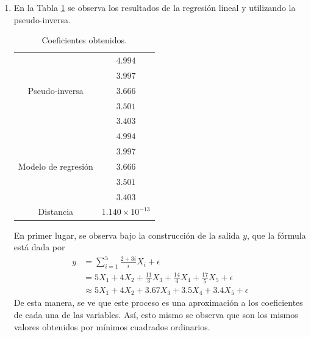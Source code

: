 \documentclass[fleqn]{article}
\begin{document}
\begin{enumerate}
  \item En la Tabla \ref{tab:coeffs} se observa los resultados de la regresión
    lineal y utilizando la pseudo-inversa.
    \begin{table}[H]
      \centering
      \begin{tabular}{cc}
        \hline
        \multirow{5}{*}{Pseudo-inversa}
        &$4.994$\\
        &$3.997$\\
        &$3.666$\\
        &$3.501$ \\
        &$3.403$ \\
        \hline
        \multirow{5}{*}{Modelo de regresión}
        &$4.994$\\
        &$3.997$ \\
        &$3.666$ \\
        &$3.501$ \\
        &$3.403$ \\
        \hline
        \multirow{1}{*}{Distancia} &$1.140 \times 10^{-13}$\\
        \hline
      \end{tabular}
      \caption{Coeficientes obtenidos.}
      \label{tab:coeffs}
    \end{table}

    En primer lugar, se observa bajo la construcción de la salida $y$, que la
    fórmula está dada por
    \begin{align*}
      y &= \sum_{i=1}^5 \frac{2 + 3i}{i}X_i + \epsilon \\
        &= 5X_1 + 4X_2 + \frac{11}{3}X_3 + \frac{14}{4}X_4 + \frac{17}{5}X_5 + \epsilon \\
        &\approx 5X_1 + 4X_2 + 3.67X_3 + 3.5X_4 + 3.4X_5 + \epsilon
    \end{align*}
    De esta manera, se ve que este proceso es una aproximación a los
    coeficientes de cada una de las variables. Así, esto mismo se observa que
    son los mismos valores obtenidos por mínimos cuadrados ordinarios.
\end{enumerate}
\end{document}
